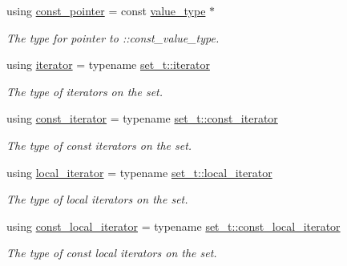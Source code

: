 \begin{DoxyCompactItemize}
using \hyperlink{group__Types_ga3d079442c0e215d47f0c93f05b2ddb1f}{const\-\_\-pointer} = const \hyperlink{group__Types_ga56832ea0d8218bf22f59a2e8ff4de499}{value\-\_\-type} $\ast$
\begin{DoxyCompactList}\small\item\em The type for pointer to \-::const\-\_\-value\-\_\-type. \end{DoxyCompactList}\item 
using \hyperlink{group__Types_gadbad50ac069a38bd820c0a9f532f903e}{iterator} = typename \hyperlink{classshad_1_1Set_a01298773ecde90c0df1e444429bf9703}{set\-\_\-t\-::iterator}
\begin{DoxyCompactList}\small\item\em The type of iterators on the set. \end{DoxyCompactList}\item 
using \hyperlink{group__Types_ga074f67d0516c3a68d8c79976aef62fb1}{const\-\_\-iterator} = typename \hyperlink{classshad_1_1Set_a0b2608f92f5397a25e62fad925fc177e}{set\-\_\-t\-::const\-\_\-iterator}
\begin{DoxyCompactList}\small\item\em The type of const iterators on the set. \end{DoxyCompactList}\item 
using \hyperlink{group__Types_gae1ee2e5ce1b39afa3cb1ce248747324d}{local\-\_\-iterator} = typename \hyperlink{classshad_1_1Set_a531920d32511b8fa5ffef94b0d772e29}{set\-\_\-t\-::local\-\_\-iterator}
\begin{DoxyCompactList}\small\item\em The type of local iterators on the set. \end{DoxyCompactList}\item 
using \hyperlink{group__Types_gac14878d16fabddc52f8dd35465f3155e}{const\-\_\-local\-\_\-iterator} = typename \hyperlink{classshad_1_1Set_a0857d9ce7a249e860e3a67bc18f7de8b}{set\-\_\-t\-::const\-\_\-local\-\_\-iterator}
\begin{DoxyCompactList}\small\item\em The type of const local iterators on the set. \end{DoxyCompactList}\end{DoxyCompactItemize}
